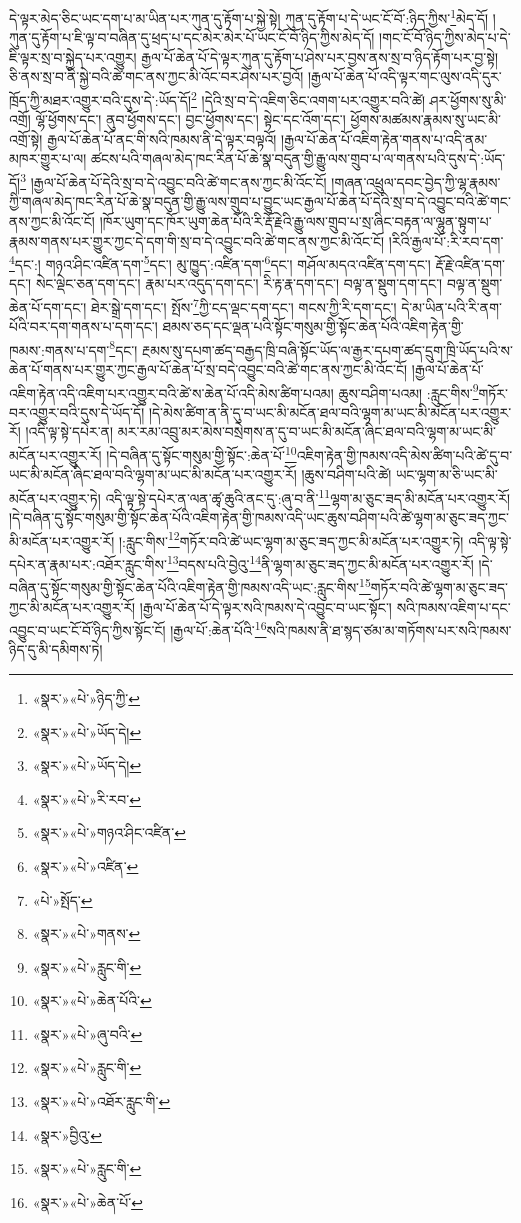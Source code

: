 དེ་ལྟར་མེད་ཅིང་ཡང་དག་པ་མ་ཡིན་པར་ཀུན་དུ་རྟོག་པ་སྐྱེ་སྟེ། ཀུན་དུ་རྟོག་པ་དེ་ཡང་ངོ་བོ་:ཉིད་ཀྱིས་\footnote{«སྣར་»«པེ་»ཉིད་ཀྱི་}མེད་དོ། །ཀུན་དུ་རྟོག་པ་ཇི་ལྟ་བ་བཞིན་དུ་ཕྲད་པ་དང་མེར་མེར་པོ་ཡང་ངོ་བོ་ཉིད་ཀྱིས་མེད་དོ། །གང་ངོ་བོ་ཉིད་ཀྱིས་མེད་པ་དེ་ཇི་ལྟར་སྲ་བ་སྐྱེད་པར་འགྱུར། རྒྱལ་པོ་ཆེན་པོ་དེ་ལྟར་ཀུན་དུ་རྟོག་པ་ཤེས་པར་བྱས་ནས་སྲ་བ་ཉིད་རྟོག་པར་བྱ་སྟེ། ཅི་ནས་སྲ་བ་ནི་སྐྱེ་བའི་ཚེ་གང་ནས་ཀྱང་མི་འོང་བར་ཤེས་པར་བྱའོ། །རྒྱལ་པོ་ཆེན་པོ་འདི་ལྟར་གང་ལུས་འདི་དུར་ཁྲོད་ཀྱི་མཐར་འགྱུར་བའི་དུས་དེ་:ཡོད་དོ།\footnote{«སྣར་»«པེ་»ཡོད་དེ།} །དེའི་སྲ་བ་དེ་འཇིག་ཅིང་འགག་པར་འགྱུར་བའི་ཚེ། ཤར་ཕྱོགས་སུ་མི་འགྲོ། ལྷོ་ཕྱོགས་དང་། ནུབ་ཕྱོགས་དང་། བྱང་ཕྱོགས་དང་། སྟེང་དང་འོག་དང་། ཕྱོགས་མཚམས་རྣམས་སུ་ཡང་མི་འགྲོ་སྟེ། རྒྱལ་པོ་ཆེན་པོ་ནང་གི་སའི་ཁམས་ནི་དེ་ལྟར་བལྟའོ། །རྒྱལ་པོ་ཆེན་པོ་འཇིག་རྟེན་གནས་པ་འདི་ནམ་མཁར་གྱུར་པ་ལ། ཚངས་པའི་གཞལ་མེད་ཁང་རིན་པོ་ཆེ་སྣ་བདུན་གྱི་རྒྱུ་ལས་གྲུབ་པ་ལ་གནས་པའི་དུས་དེ་:ཡོད་དོ།\footnote{«སྣར་»«པེ་»ཡོད་དེ།} །རྒྱལ་པོ་ཆེན་པོ་དེའི་སྲ་བ་དེ་འབྱུང་བའི་ཚེ་གང་ནས་ཀྱང་མི་འོང་ངོ། །གཞན་འཕྲུལ་དབང་བྱེད་ཀྱི་ལྷ་རྣམས་ཀྱི་གཞལ་མེད་ཁང་རིན་པོ་ཆེ་སྣ་བདུན་གྱི་རྒྱུ་ལས་གྲུབ་པ་བྱུང་ཡང་རྒྱལ་པོ་ཆེན་པོ་དེའི་སྲ་བ་དེ་འབྱུང་བའི་ཚེ་གང་ནས་ཀྱང་མི་འོང་ངོ། །ཁོར་ཡུག་དང་ཁོར་ཡུག་ཆེན་པོའི་རི་རྡོ་རྗེའི་རྒྱུ་ལས་གྲུབ་པ་སྲ་ཞིང་བརྟན་ལ་ལྷུན་སྟུག་པ་རྣམས་གནས་པར་གྱུར་ཀྱང་དེ་དག་གི་སྲ་བ་དེ་འབྱུང་བའི་ཚེ་གང་ནས་ཀྱང་མི་འོང་ངོ། །རིའི་རྒྱལ་པོ་:རི་རབ་དག་\footnote{«སྣར་»«པེ་»རི་རབ་}དང་:། གཉའ་ཤིང་འཛིན་དག་\footnote{«སྣར་»«པེ་»གཉའ་ཤིང་འཛིན་}དང་། མུ་ཁྱུད་:འཛིན་དག་\footnote{«སྣར་»«པེ་»འཛིན་}དང་། གཤོལ་མདའ་འཛིན་དག་དང་། རྡོ་རྗེ་འཛིན་དག་དང་། སེང་ལྡེང་ཅན་དག་དང་། རྣམ་པར་འདུད་དག་དང་། རི་རྟ་རྣ་དག་དང་། བལྟ་ན་སྡུག་དག་དང་། བལྟ་ན་སྡུག་ཆེན་པོ་དག་དང་། ཐེར་སྒྲེ་དག་དང་། སྤོས་\footnote{«པེ་»སྤོད་}ཀྱི་ངད་ལྡང་དག་དང་། གངས་ཀྱི་རི་དག་དང་། དེ་མ་ཡིན་པའི་རི་ནག་པོའི་བར་དག་གནས་པ་དག་དང་། ཐམས་ཅད་དང་ལྡན་པའི་སྟོང་གསུམ་གྱི་སྟོང་ཆེན་པོའི་འཇིག་རྟེན་གྱི་ཁམས་:གནས་པ་དག་\footnote{«སྣར་»«པེ་»གནས་}དང་། རྔམས་སུ་དཔག་ཚད་བརྒྱད་ཁྲི་བཞི་སྟོང་ཡོད་ལ་རྒྱར་དཔག་ཚད་དྲུག་ཁྲི་ཡོད་པའི་ས་ཆེན་པོ་གནས་པར་གྱུར་ཀྱང་རྒྱལ་པོ་ཆེན་པོ་སྲ་བདེ་འབྱུང་བའི་ཚེ་གང་ནས་ཀྱང་མི་འོང་ངོ། །རྒྱལ་པོ་ཆེན་པོ་འཇིག་རྟེན་འདི་འཇིག་པར་འགྱུར་བའི་ཚེ་ས་ཆེན་པོ་འདི་མེས་ཚིག་པའམ། ཆུས་བཤིག་པའམ། :རླུང་གིས་\footnote{«སྣར་»«པེ་»རླུང་གི་}གཏོར་བར་འགྱུར་བའི་དུས་དེ་ཡོད་དོ། །དེ་མེས་ཚིག་ན་ནི་དུ་བ་ཡང་མི་མངོན་ཐལ་བའི་ལྷག་མ་ཡང་མི་མངོན་པར་འགྱུར་རོ། །འདི་ལྟ་སྟེ་དཔེར་ན། མར་རམ་འབྲུ་མར་མེས་བསྲེགས་ན་དུ་བ་ཡང་མི་མངོན་ཞིང་ཐལ་བའི་ལྷག་མ་ཡང་མི་མངོན་པར་འགྱུར་རོ། །དེ་བཞིན་དུ་སྟོང་གསུམ་གྱི་སྟོང་:ཆེན་པོ་\footnote{«སྣར་»«པེ་»ཆེན་པོའི་}འཇིག་རྟེན་གྱི་ཁམས་འདི་མེས་ཚིག་པའི་ཚེ་དུ་བ་ཡང་མི་མངོན་ཞིང་ཐལ་བའི་ལྷག་མ་ཡང་མི་མངོན་པར་འགྱུར་རོ། །ཆུས་བཤིག་པའི་ཚེ། ཡང་ལྷག་མ་ཅི་ཡང་མི་མངོན་པར་འགྱུར་ཏེ། འདི་ལྟ་སྟེ་དཔེར་ན་ལན་ཚྭ་ཆུའི་ནང་དུ་:ཞུ་བ་ནི་\footnote{«སྣར་»«པེ་»ཞུ་བའི་}ལྷག་མ་ཅུང་ཟད་མི་མངོན་པར་འགྱུར་རོ། །དེ་བཞིན་དུ་སྟོང་གསུམ་གྱི་སྟོང་ཆེན་པོའི་འཇིག་རྟེན་གྱི་ཁམས་འདི་ཡང་ཆུས་བཤིག་པའི་ཚེ་ལྷག་མ་ཅུང་ཟད་ཀྱང་མི་མངོན་པར་འགྱུར་རོ། །:རླུང་གིས་\footnote{«སྣར་»«པེ་»རླུང་གི་}གཏོར་བའི་ཚེ་ཡང་ལྷག་མ་ཅུང་ཟད་ཀྱང་མི་མངོན་པར་འགྱུར་ཏེ། འདི་ལྟ་སྟེ་དཔེར་ན་རྣམ་པར་:འཐོར་རླུང་གིས་\footnote{«སྣར་»«པེ་»འཐོར་རླུང་གི་}བདས་པའི་བྱེའུ་\footnote{«སྣར་»བྱིའུ་}ནི་ལྷག་མ་ཅུང་ཟད་ཀྱང་མི་མངོན་པར་འགྱུར་རོ། །དེ་བཞིན་དུ་སྟོང་གསུམ་གྱི་སྟོང་ཆེན་པོའི་འཇིག་རྟེན་གྱི་ཁམས་འདི་ཡང་:རླུང་གིས་\footnote{«སྣར་»«པེ་»རླུང་གི་}གཏོར་བའི་ཚེ་ལྷག་མ་ཅུང་ཟད་ཀྱང་མི་མངོན་པར་འགྱུར་རོ། །རྒྱལ་པོ་ཆེན་པོ་དེ་ལྟར་སའི་ཁམས་དེ་འབྱུང་བ་ཡང་སྟོང་། སའི་ཁམས་འཇིག་པ་དང་འབྱུང་བ་ཡང་ངོ་བོ་ཉིད་ཀྱིས་སྟོང་ངོ། །རྒྱལ་པོ་:ཆེན་པོའི་\footnote{«སྣར་»«པེ་»ཆེན་པོ་}སའི་ཁམས་ནི་ཐ་སྙད་ཙམ་མ་གཏོགས་པར་སའི་ཁམས་ཉིད་དུ་མི་དམིགས་ཏེ། 
